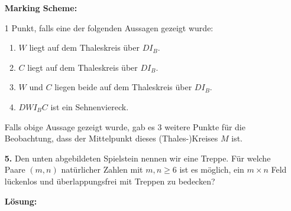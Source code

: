 \documentclass[language=german,style=solution]{smo}
\begin{document}
\begin{enumerate}
\textbf{Marking Scheme:}

1 Punkt, falls eine der folgenden Aussagen gezeigt wurde:
\begin{enumerate}[1)]
\item $W$ liegt auf dem Thaleskreis über $DI_B$.
\item $C$ liegt auf dem Thaleskreis über $DI_B$.
\item $W$ und $C$ liegen beide auf dem Thaleskreis über $DI_B$.
\item $DWI_BC$ ist ein Sehnenviereck.
\end{enumerate}
Falls obige Aussage gezeigt wurde, gab es 3 weitere Punkte für die Beobachtung, dass der Mittelpunkt dieses (Thales-)Kreises $M$ ist.

\newpage

\item[\textbf{5.}] 
Den unten abgebildeten Spielstein nennen wir eine Treppe. Für welche Paare $(m,n)$ natürlicher Zahlen mit $m,n\geq 6$ ist es möglich, ein $m\times n$ Feld lückenlos und überlappungsfrei mit Treppen zu bedecken?
\vspace{-0cm}
\begin{center}

\quad
\end{center}

\textbf{Lösung:}


\end{enumerate}
\end{document}
